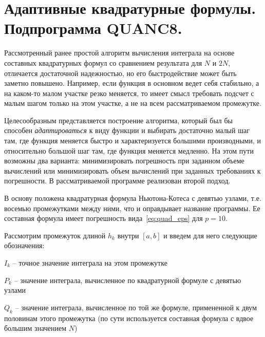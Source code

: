 \section{Адаптивные квадратурные формулы. Подпрограмма \textbf{QUANC8}.}\label{sec:ch11}
Рассмотренный ранее простой алгоритм вычисления интеграла на основе составных квадратурных формул со сравнением
результата для $N$ и $2N$, отличается достаточной надежностью, но его быстродействие может быть заметно повышено.
Например, если функция в основном ведет себя стабильно, а на каком-то малом участке резко меняется, то имеет смысл
требовать подсчет с малым шагом только на этом участке, а не на всем рассматриваемом промежутке.

Целесообразным представляется построение алгоритма, который был бы способен \emph{адаптироваться} к виду функции и
выбирать достаточно малый шаг там, где функция меняется быстро и характеризуется большими производными, и относительно
большой шаг там, где функция меняется медленно. На этом пути возможны два варианта: минимизировать погрешность при
заданном объеме вычислений или минимизировать объем вычислений при заданных требованиях к погрешности. В рассматриваемой
программе реализован второй подход.

В основу положена квадратурная формула Ньютона-Котеса с девятью узлами, т.е. восемью промежутками между ними, что и
оправдывает название программы. Ее составная формула имеет погрешность вида~\eqref{eq:quad_eps} для $p=10$.

Рассмотрим промежуток длиной $h_k$ внутри $[a, b]$ и введем для него следующие обозначения:

$I_k$ -- точное значение интеграла на этом промежутке

$P_k$ -- значение интеграла, вычисленное по квадратурной формуле с девятью узлами

$Q_k$ -- значение интеграла, вычисленное по той же формуле, примененной к двум половинам этого промежутка (по сути
используется составная формула с вдвое большим значением $N$)

